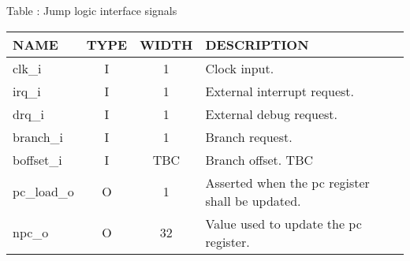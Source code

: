{
  \vspace{0.5em}
  \begin{center}
    Table \thetable: Jump logic interface signals\label{tab:jump-logic}
  \end{center}

\footnotesize
\begin{xltabular}{0.9\textwidth}{|l|c|c|X|}
  \hline
  \textbf{NAME} & \textbf{TYPE} & \textbf{WIDTH} & \textbf{DESCRIPTION} \\
  \hline
  clk\_i & I & 1 & Clock input. \\
  \hline
  irq\_i & I & 1 & External interrupt request. \\
  \hline
  drq\_i & I & 1 & External debug request. \\
  \hline
  branch\_i & I & 1 & Branch request. \\
  \hline
  boffset\_i & I & TBC & Branch offset. TBC \\
  \hline
  pc\_load\_o & O & 1 & Asserted when the pc register shall be updated. \\
  \hline
  npc\_o & O & 32 & Value used to update the pc register. \\
  \hline
\end{xltabular}
}
